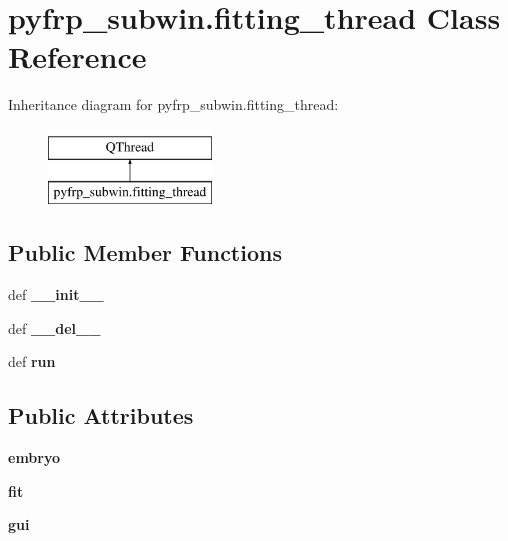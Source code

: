 \hypertarget{classpyfrp__subwin_1_1fitting__thread}{\section{pyfrp\+\_\+subwin.\+fitting\+\_\+thread Class Reference}
\label{classpyfrp__subwin_1_1fitting__thread}
}
Inheritance diagram for pyfrp\+\_\+subwin.\+fitting\+\_\+thread\+:\begin{figure}[H]
\begin{center}
\leavevmode
\includegraphics[height=2.000000cm]{classpyfrp__subwin_1_1fitting__thread}
\end{center}
\end{figure}
\subsection*{Public Member Functions}
\begin{DoxyCompactItemize}
\item 
\hypertarget{classpyfrp__subwin_1_1fitting__thread_a135c920b529d2edae9008c8c18d6395a}{def {\bfseries \+\_\+\+\_\+init\+\_\+\+\_\+}}\label{classpyfrp__subwin_1_1fitting__thread_a135c920b529d2edae9008c8c18d6395a}

\item 
\hypertarget{classpyfrp__subwin_1_1fitting__thread_a8c972c271919a9cbe47f8fe04951218f}{def {\bfseries \+\_\+\+\_\+del\+\_\+\+\_\+}}\label{classpyfrp__subwin_1_1fitting__thread_a8c972c271919a9cbe47f8fe04951218f}

\item 
\hypertarget{classpyfrp__subwin_1_1fitting__thread_a0a0c89e456cafdba6deade43af541a19}{def {\bfseries run}}\label{classpyfrp__subwin_1_1fitting__thread_a0a0c89e456cafdba6deade43af541a19}

\end{DoxyCompactItemize}
\subsection*{Public Attributes}
\begin{DoxyCompactItemize}
\item 
\hypertarget{classpyfrp__subwin_1_1fitting__thread_a55703cecdb5dac7573ce1d8928c820a5}{{\bfseries embryo}}\label{classpyfrp__subwin_1_1fitting__thread_a55703cecdb5dac7573ce1d8928c820a5}

\item 
\hypertarget{classpyfrp__subwin_1_1fitting__thread_a1fb3c160a8becf8171df6ebe663f95bc}{{\bfseries fit}}\label{classpyfrp__subwin_1_1fitting__thread_a1fb3c160a8becf8171df6ebe663f95bc}

\item 
\hypertarget{classpyfrp__subwin_1_1fitting__thread_a750ec7f2cd641743b8a957f0334c9b25}{{\bfseries gui}}\label{classpyfrp__subwin_1_1fitting__thread_a750ec7f2cd641743b8a957f0334c9b25}

\end{DoxyCompactItemize}
